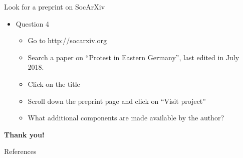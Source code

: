 \documentclass{beamer}
\begin{document}

\begin{frame}{Look for a preprint on SocArXiv}
	\begin{itemize}
    \item Question 4
      \begin{itemize}
          \item Go to http://socarxiv.org
          \item Search a paper on ``Protest in Eastern Germany'', last edited in July 2018.
          \item Click on the title
          \item Scroll down the preprint page and click on ``Visit project'' 
          \item What additional components are made available by the author?
      \end{itemize}
    \end{itemize}
\end{frame}


\begin{frame}{}
\begin{center}
	\textbf{\large Thank you!}
\end{center}
\end{frame}

\appendix
\begin{frame}[allowframebreaks]{References}


\end{frame}

\end{document}
